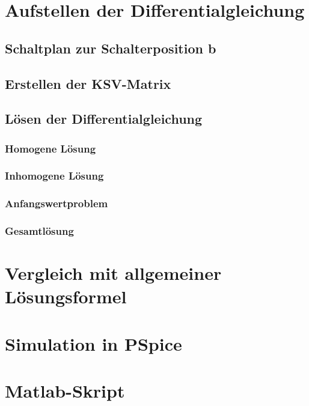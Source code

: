 \documentclass[11pt]{scrartcl}
\begin{document}
\section{Aufstellen der Differentialgleichung} %
\subsection{Schaltplan zur Schalterposition b}
\subsection{Erstellen der KSV-Matrix}
\subsection{Lösen der Differentialgleichung}
\subsubsection{Homogene Lösung}
\subsubsection{Inhomogene Lösung}
\subsubsection{Anfangswertproblem}
\subsubsection{Gesamtlösung}
\section{Vergleich mit allgemeiner Lösungsformel}
\section{Simulation in PSpice}
\section{Matlab-Skript}
\end{document}

